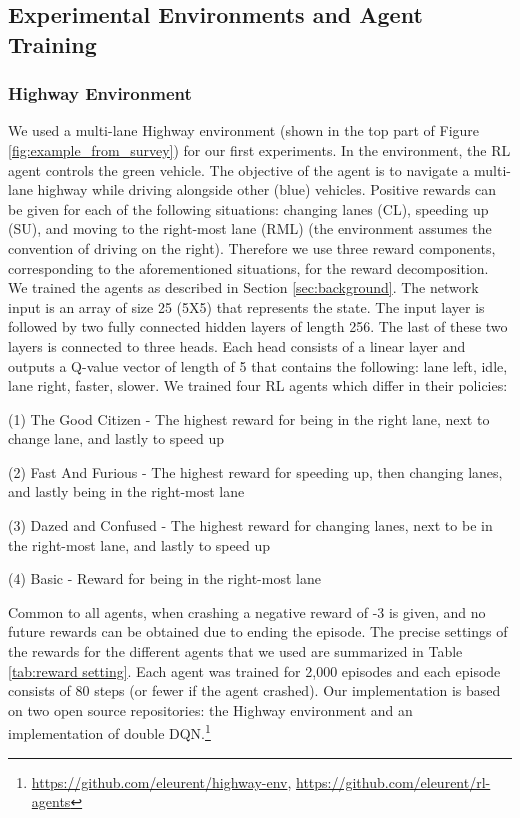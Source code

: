 \documentclass[runningheads]{llncs}
\begin{document}
\subsection{Experimental Environments and Agent Training}
\label{sec:exp_domains}
\subsubsection{Highway Environment}
We used a multi-lane Highway environment (shown in the top part of Figure \ref{fig:example_from_survey}) for our first experiments.
In the environment, the RL agent controls the green vehicle. The objective of the agent is to navigate a multi-lane highway while driving alongside other (blue) vehicles. Positive rewards can be given for each of the following situations: changing lanes (CL), speeding up (SU), and moving to the right-most lane (RML) (the environment assumes the convention of driving on the right). 
Therefore we use three reward components, corresponding to the aforementioned situations, for the reward decomposition. 
We trained the agents as described in Section \ref{sec:background}.
The network input is an array of size 25 (5X5) that represents the state. The input layer is followed by two fully connected hidden layers of length 256. The last of these two layers is connected to three heads. Each head consists of a linear layer and outputs a Q-value vector of length of 5 that contains the following: lane left, idle, lane right, faster, slower.
We trained four RL agents which differ in their policies:

(1) The Good Citizen -  The highest reward for being in the right lane, next to change lane, and lastly to speed up

(2) Fast And Furious - The highest reward for speeding up, then changing lanes, and lastly being in the right-most lane

(3) Dazed and Confused - The highest reward for changing lanes, next to be in the right-most lane, and lastly to speed up

(4) Basic - Reward for being in the right-most lane

Common to all agents, when crashing a negative reward of -3 is given, and no future rewards can be obtained due to ending the episode. 
The precise settings of the rewards for the different agents that we used are summarized in Table \ref{tab:reward setting}.
Each agent was trained for 2,000 episodes and each episode consists of 80 steps (or fewer if the agent crashed). 
Our implementation is based on two open source repositories: the Highway environment and an implementation of double DQN.\footnote{\url{https://github.com/eleurent/highway-env}, \url{https://github.com/eleurent/rl-agents}}
\end{document}
